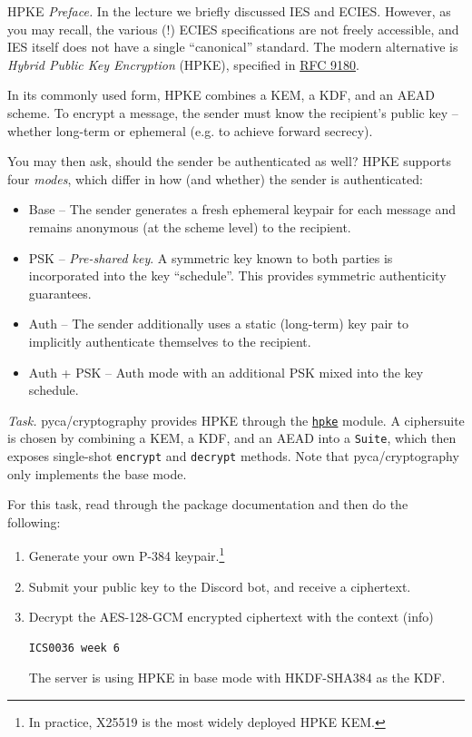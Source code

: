 \documentclass{practice}
\begin{document}
\begin{task}{HPKE}
  \textit{Preface.}
  In the lecture we briefly discussed IES and ECIES.
  However, as you may recall, the various (!) ECIES specifications are not freely accessible, and IES itself does not have a single \enquote{canonical} standard.
  The modern alternative is \emph{Hybrid Public Key Encryption} (HPKE), specified in \href{https://datatracker.ietf.org/doc/html/rfc9180}{RFC 9180}.

  In its commonly used form, HPKE combines a KEM, a KDF, and an AEAD scheme.
  To encrypt a message, the sender must know the recipient's public key -- whether long-term or ephemeral (e.g. to achieve forward secrecy).

  You may then ask, should the sender be authenticated as well?
  HPKE supports four \emph{modes}, which differ in how (and whether) the sender is authenticated:
  \begin{itemize}
    \item Base -- The sender generates a fresh ephemeral keypair for each message and remains anonymous (at the scheme level) to the recipient.
    \item PSK -- \emph{Pre-shared key}.
    A symmetric key known to both parties is incorporated into the key \enquote{schedule}.
    This provides symmetric authenticity guarantees.
    \item Auth -- The sender additionally uses a static (long-term) key pair to implicitly authenticate themselves to the recipient.
    \item Auth + PSK -- Auth mode with an additional PSK mixed into the key schedule.
  \end{itemize}

  \textit{Task.}
  pyca/cryptography provides HPKE through the \href{https://cryptography.io/en/latest/hazmat/primitives/hpke/}{\texttt{hpke}} module.
  A ciphersuite is chosen by combining a KEM, a KDF, and an AEAD into a \texttt{Suite}, which then exposes single-shot \texttt{encrypt} and \texttt{decrypt} methods.
  Note that pyca/cryptography only implements the base mode.

  For this task, read through the package documentation and then do the following:
  \begin{enumerate}
    \item Generate your own P-384 keypair.\footnote{In practice, X25519 is the most widely deployed HPKE KEM.}
    \item Submit your public key to the Discord bot, and receive a ciphertext.
    \item Decrypt the AES-128-GCM encrypted ciphertext with the context (info)
    \begin{Verbatim}
ICS0036 week 6
    \end{Verbatim}
    The server is using HPKE in base mode with HKDF-SHA384 as the KDF.
  \end{enumerate}
\end{task}
\end{document}

